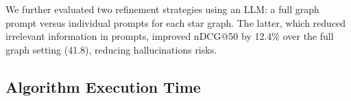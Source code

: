 We further evaluated two refinement strategies using an LLM: a full graph prompt versus individual prompts for each star graph. The latter, which reduced irrelevant information in prompts, improved nDCG@50 by 12.4\% over the full graph setting (41.8), reducing hallucinations risks.













{\editcolor 
\vspace{-1mm}
\subsection{Algorithm Execution Time}
\label{sec:exp_efficiency}

\begin{table}[t]
    \centering
    \vspace{-3mm}
    \caption{\label{tab:computational_overhead}
        Algorithm execution time comparison
    }
\end{table}

}
